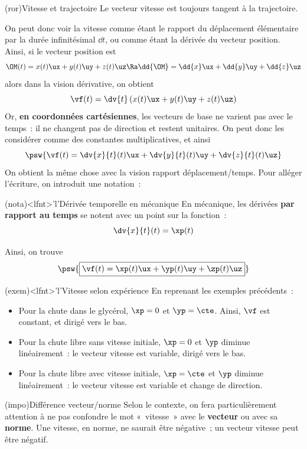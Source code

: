 \documentclass[../../main/main.tex]{subfiles}
\begin{document}
\begin{tcb*}(ror){Vitesse et trajectoire}
	Le vecteur vitesse est toujours tangent à la trajectoire.
\end{tcb*}

On peut donc voir la vitesse comme étant le rapport du déplacement élémentaire
par la durée infinitésimal $\dd{t}$, ou comme étant la dérivée du vecteur
position.
\smallbreak
Ainsi, si le vecteur position est
\[
	\OM(t) = x(t)\ux + y(t)\uy + z(t)\uz
	\Ra
	\dd{\OM} = \dd{x}\ux + \dd{y}\uy + \dd{z}\uz
\]
alors dans la vision dérivative, on obtient
\[\vf(t) = \dv{t}\left(x(t)\ux + y(t)\uy + z(t)\uz\right)\]
Or, \textbf{en coordonnées cartésiennes}, les vecteurs de base ne varient pas
avec le temps~: il ne changent pas de direction et restent unitaires. On peut
donc les considérer comme des constantes multiplicatives, et ainsi
\[\psw{\vf(t) = \dv{x}{t}(t)\ux + \dv{y}{t}(t)\uy + \dv{z}{t}(t)\uz}\]
On obtient la même chose avec la vision rapport déplacement/temps.
Pour alléger l'écriture, on introduit une notation~:
\begin{tcb*}(nota)<lfnt>'l'{Dérivée temporelle en mécanique}
	En mécanique, les dérivées \textbf{par rapport au temps} se notent avec un
	point sur la fonction~:
	\[\dv{x}{t}(t) = \xp(t)\]
\end{tcb*}
Ainsi, on trouve
\[\psw{\boxed{\vf(t) = \xp(t)\ux + \yp(t)\uy + \zp(t)\uz}}\]

\begin{tcb*}(exem)<lfnt>'l'{Vitesse selon expérience}
	En reprenant les exemples précédents~:
	\begin{itemize}
		\item Pour la chute dans le glycérol, $\xp = 0$ et $\yp = \cte$. Ainsi,
		      $\vf$ est constant, et dirigé vers le bas.
		\item Pour la chute libre sans vitesse initiale, $\xp = 0$ et $\yp$
		      diminue linéairement~: le vecteur vitesse est variable, dirigé vers
		      le bas.
		\item Pour la chute libre avec vitesse initiale, $\xp = \cte$ et $\yp$
		      diminue linéairement~: le vecteur vitesse est variable et change de
		      direction.
	\end{itemize}
\end{tcb*}

\begin{tcb*}(impo){Différence vecteur/norme}
	Selon le contexte, on fera particulièrement attention à ne pas confondre le
	mot «~vitesse~» avec le \textbf{vecteur} ou avec sa \textbf{norme}. Une
	vitesse, en norme, ne saurait être négative~; un vecteur vitesse peut être
	négatif.
\end{tcb*}
\end{document}
